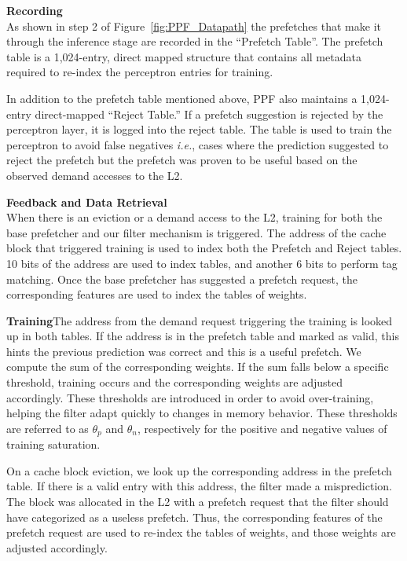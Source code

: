 \noindent \textbf{Recording}\\
As shown in step 2 of Figure~\ref{fig:PPF_Datapath} the prefetches
that make it through the inference stage are recorded in the
``Prefetch Table''. The prefetch table is a 1,024-entry, direct mapped
structure that contains all metadata required to re-index the
perceptron entries for training.

In addition to the prefetch table mentioned above, PPF also maintains
a 1,024-entry direct-mapped ``Reject Table.'' If a prefetch suggestion
is rejected by the perceptron layer, it is logged into the reject
table. The table is used to train the perceptron to avoid false
negatives \textit{i.e.}, cases where the prediction suggested to
reject the prefetch but the prefetch was proven to be useful based on
the observed demand accesses to the L2.

\noindent \textbf{Feedback and Data Retrieval}\\
When there is an eviction or a demand access to the L2, training for
both the base prefetcher and our filter mechanism is triggered. The
address of the cache block that triggered training is used to index
both the Prefetch and Reject tables. 10 bits of the address are used
to index tables, and another 6 bits to perform tag matching. Once the
base prefetcher has suggested a prefetch request, the corresponding
features are used to index the tables of weights.


\noindent \textbf{Training}\newline The address from the demand
request triggering the training is looked up in both tables. If the
address is in the prefetch table and marked as valid, this hints the
previous prediction was correct and this is a useful prefetch. We
compute the sum of the corresponding weights. If the sum falls below a
specific threshold, training occurs and the corresponding weights are
adjusted accordingly. These thresholds are introduced in order to
avoid over-training, helping the filter adapt quickly to changes in
memory behavior. These thresholds are referred to as $\theta_p$ and
$\theta_n$, respectively for the positive and negative values of
training saturation.

On a cache block eviction, we look up the corresponding address in the
prefetch table. If there is a valid entry with this address, the
filter made a misprediction. The block was allocated in the L2 with a
prefetch request that the filter should have categorized as a useless
prefetch. Thus, the corresponding features of the prefetch request are
used to re-index the tables of weights, and those weights are adjusted
accordingly.

